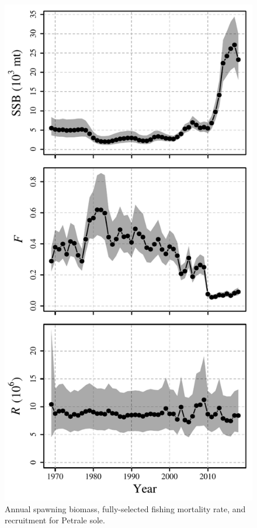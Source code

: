 \documentclass[]{article}
\begin{document}
\begin{figure}
\caption{Annual spawning biomass, fully-selected fishing mortality rate, and recruitment for Petrale sole.}\label{SSB_F_R}
\begin{center}
\includegraphics[height = 0.8\textheight]{../results/ssm_temp/petrale_SSB_F_R.pdf}
\end{center}
\end{figure}
\end{document}
